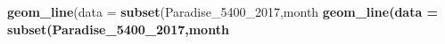 \documentclass[]{book}
\newenvironment{Shaded}{\begin{snugshade}}{\end{snugshade}}
\newcommand{\KeywordTok}[1]{\textcolor[rgb]{0.13,0.29,0.53}{\textbf{#1}}}
\newcommand{\DataTypeTok}[1]{\textcolor[rgb]{0.13,0.29,0.53}{#1}}
\newcommand{\DecValTok}[1]{\textcolor[rgb]{0.00,0.00,0.81}{#1}}
\newcommand{\StringTok}[1]{\textcolor[rgb]{0.31,0.60,0.02}{#1}}
\newcommand{\OperatorTok}[1]{\textcolor[rgb]{0.81,0.36,0.00}{\textbf{#1}}}
\newcommand{\NormalTok}[1]{#1}
\theoremstyle{definition}
\theoremstyle{definition}
\theoremstyle{definition}
\theoremstyle{remark}
\begin{document}
\begin{Shaded}
\begin{Highlighting}[]
{{\KeywordTok{geom_line}\NormalTok{(}\DataTypeTok{data =} \KeywordTok{subset}\NormalTok{(Paradise_5400_}\DecValTok{2017}\NormalTok{,month }\OperatorTok{%in%}\StringTok{ }\KeywordTok{c}\NormalTok{(}\StringTok{"07"}\NormalTok{) }\OperatorTok{&}\StringTok{ }\NormalTok{day }\OperatorTok{%in%}\StringTok{ }\KeywordTok{c}\NormalTok{(}\StringTok{"17"}\NormalTok{)  ))}\OperatorTok{+}\StringTok{ }\KeywordTok{geom_line}\NormalTok{(}\DataTypeTok{data =} \KeywordTok{subset}\NormalTok{(Paradise_5400_}\DecValTok{2017}\NormalTok{,month }\OperatorTok{%in%}\StringTok{ }\KeywordTok{c}\NormalTok{(}\StringTok{"08"}\NormalTok{) }\OperatorTok{&}\StringTok{ }\NormalTok{day }\OperatorTok{%in%}\StringTok{ }\KeywordTok{c}\NormalTok{(}\StringTok{"17"}\NormalTok{)  ))}\OperatorTok{+}\StringTok{ }\KeywordTok{geom_line}\NormalTok{(}\DataTypeTok{data =} \KeywordTok{subset}\NormalTok{(Paradise_5400_}\DecValTok{2017}\NormalTok{,month }\OperatorTok{%in%}\StringTok{ }\KeywordTok{c}\NormalTok{(}\StringTok{"09"}\NormalTok{) }\OperatorTok{&}\StringTok{ }\NormalTok{day }\OperatorTok{%in%}\StringTok{ }\KeywordTok{c}\NormalTok{(}\StringTok{"17"}\NormalTok{)  ))  }\OperatorTok{+}\StringTok{  }
\KeywordTok{geom_line}\NormalTok{(}\DataTypeTok{data =} \KeywordTok{subset}\NormalTok{(Paradise_5400_}\DecValTok{2017}\NormalTok{,month }\OperatorTok{%in%}\StringTok{ }\KeywordTok{c}\NormalTok{(}\StringTok{"07"}\NormalTok{) }\OperatorTok{&}\StringTok{ }\NormalTok{day }\OperatorTok{%in%}\StringTok{ }\KeywordTok{c}\NormalTok{(}\StringTok{"18"}\NormalTok{)  ))}\OperatorTok{+}\StringTok{ }\KeywordTok{geom_line}\NormalTok{(}\DataTypeTok{data =} \KeywordTok{subset}\NormalTok{(Paradise_5400_}\DecValTok{2017}\NormalTok{,month }\OperatorTok{%in%}\StringTok{ }\KeywordTok{c}\NormalTok{(}\StringTok{"08"}\NormalTok{) }\OperatorTok{&}\StringTok{ }\NormalTok{day }\OperatorTok{%in%}\StringTok{ }\KeywordTok{c}\NormalTok{(}\StringTok{"18"}\NormalTok{)  ))}\OperatorTok{+}\StringTok{ }\KeywordTok{geom_line}\NormalTok{(}\DataTypeTok{data =} \KeywordTok{subset}\NormalTok{(Paradise_5400_}\DecValTok{2017}\NormalTok{,month }\OperatorTok{%in%}\StringTok{ }\KeywordTok{c}\NormalTok{(}\StringTok{"09"}\NormalTok{) }\OperatorTok{&}\StringTok{ }\NormalTok{day }\OperatorTok{%in%}\StringTok{ }\KeywordTok{c}\NormalTok{(}\StringTok{"18"}\NormalTok{)  ))  }\OperatorTok{+}\StringTok{  }
}}}}
\end{Highlighting}
\end{Shaded}
\end{document}
